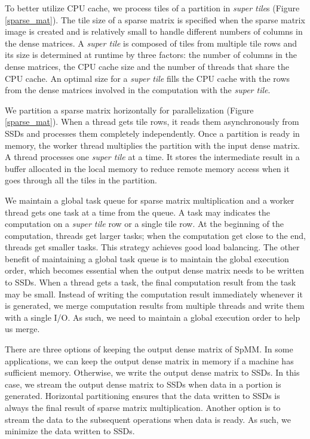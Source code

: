 To better utilize CPU cache, we process tiles of a partition in
\textit{super tile}s (Figure \ref{sparse_mat}). The tile size of a sparse
matrix is specified when the sparse matrix image is created and is relatively
small to handle different numbers of columns in the dense matrices.
A \textit{super tile} is composed of tiles from multiple tile rows and its
size is determined at runtime by three factors: the number of columns
in the dense matrices, the CPU cache size and the number of threads that
share the CPU cache. An optimal size for a \textit{super tile} fills
the CPU cache with the rows from the dense matrices involved in
the computation with the \textit{super tile}.

We partition a sparse matrix horizontally for parallelization (Figure
\ref{sparse_mat}). When a thread gets tile rows, it reads them asynchronously
from SSDs and processes them completely independently. Once a partition
is ready in memory, the worker thread multiplies the partition with the input
dense matrix. A thread processes one \textit{super tile} at a time. It stores
the intermediate result in a buffer allocated in the local memory to reduce
remote memory access when it goes through all the tiles in the partition.

We maintain a global task queue for sparse matrix multiplication and a worker
thread gets one task at a time from the queue. A task may
indicates the computation on a \textit{super tile} row or a single tile row.
At the beginning of the computation, threads get larger tasks; when
the computation get close to the end, threads get smaller tasks. This strategy
achieves good load balancing. The other benefit of maintaining a global
task queue is to maintain the global execution order, which becomes essential
when the output dense matrix needs to be written to SSDs. When a thread gets
a task, the final computation result from the task may be small. Instead of
writing the computation result immediately whenever it is generated, we merge
computation results from multiple threads and write them with a single I/O.
As such, we need to maintain a global execution order to help us merge.

There are three options of keeping the output dense matrix of SpMM. In some
applications, we can keep the output dense matrix in memory if a machine has
sufficient memory. Otherwise, we write the output dense matrix to SSDs.
In this case, we stream the output dense matrix to SSDs when data in a portion
is generated. Horizontal partitioning ensures that the data written to SSDs is
always the final result of sparse matrix multiplication. Another option is to
stream the data to the subsequent operations when data is ready.  As such, we minimize the data written to SSDs.

